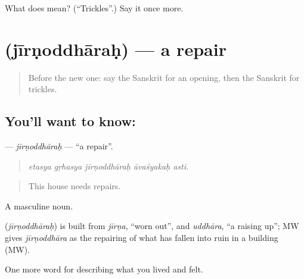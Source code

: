 \begin{tcolorbox}[breakable,colback=teal!4,colframe=teal!35!black,title={Before you move on}]
What does  mean? (\textquotedblleft{}Trickles\textquotedblright{}.) Say it once more.
\end{tcolorbox}
\section[\texorpdfstring{\sk{जीर्णोद्धारः} (jīrṇoddhāraḥ)}{जीर्णोद्धारः (jīrṇoddhāraḥ)}]{ (jīrṇoddhāraḥ) — a repair}

\label{lesson:SA-C509-jirnoddharah}



\begin{quote}
Before the new one: say the Sanskrit for an opening, then the Sanskrit for trickles.
\end{quote}

\subsection*{You'll want to know: }
\textbf{} — \emph{jīrṇoddhāraḥ} — \textquotedblleft{}a repair\textquotedblright{}.

\begin{quote}
    
\end{quote}

\begin{quote}
\emph{etasya gṛhasya jīrṇoddhāraḥ āvaśyakaḥ asti.}
\end{quote}

\begin{quote}
This house needs repairs.
\end{quote}

A masculine noun.

\begin{cousinweb}
\textbf{} (\emph{jīrṇoddhāraḥ}) is built from \emph{jīrṇa}, \textquotedblleft{}worn out\textquotedblright{}, and \emph{uddhāra}, \textquotedblleft{}a raising up\textquotedblright{}; MW gives \emph{jīrṇoddhāra} as the repairing of what has fallen into ruin in a building (MW).
\end{cousinweb}

\begin{grammarlens}[title={What you've built}]
One more word for describing what you lived and felt.
\end{grammarlens}

